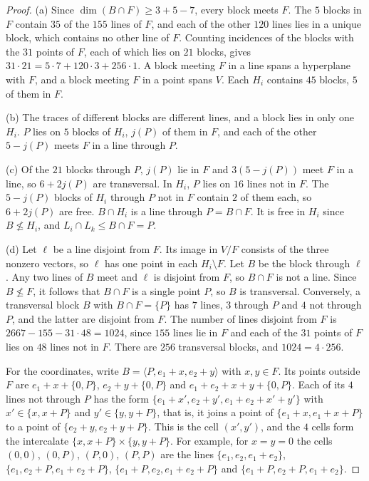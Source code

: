 \documentclass[11pt]{amsart}
\theoremstyle{definition}
\begin{document}
\begin{proof}
(a) Since $\dim(B\cap F)\ge3+5-7$, every block meets $F$. The $5$ blocks in $F$ contain $35$ of the $155$ lines of $F$, and each of the other $120$ lines lies in a unique block, which contains no other line of $F$. Counting incidences of the blocks with the $31$ points of $F$, each of which lies on $21$ blocks, gives $31\cdot21=5\cdot7+120\cdot3+256\cdot1$. A block meeting $F$ in a line spans a hyperplane with $F$, and a block meeting $F$ in a point spans $V$. Each $H_i$ contains $45$ blocks, $5$ of them in $F$.

(b) The traces of different blocks are different lines, and a block lies in only one $H_i$. $P$ lies on $5$ blocks of $H_i$, $j(P)$ of them in $F$, and each of the other $5-j(P)$ meets $F$ in a line through $P$.

(c) Of the $21$ blocks through $P$, $j(P)$ lie in $F$ and $3(5-j(P))$ meet $F$ in a line, so $6+2j(P)$ are transversal. In $H_i$, $P$ lies on $16$ lines not in $F$. The $5-j(P)$ blocks of $H_i$ through $P$ not in $F$ contain $2$ of them each, so $6+2j(P)$ are free. $B\cap H_i$ is a line through $P=B\cap F$. It is free in $H_i$ since $B\not\le H_i$, and $L_i\cap L_k\le B\cap F=P$.

(d) Let $\ell$ be a line disjoint from $F$. Its image in $V/F$ consists of the three nonzero vectors, so $\ell$ has one point in each $H_i\setminus F$. Let $B$ be the block through $\ell$. Any two lines of $B$ meet and $\ell$ is disjoint from $F$, so $B\cap F$ is not a line. Since $B\not\le F$, it follows that $B\cap F$ is a single point $P$, so $B$ is transversal. Conversely, a transversal block $B$ with $B\cap F=\{P\}$ has $7$ lines, $3$ through $P$ and $4$ not through $P$, and the latter are disjoint from $F$. The number of lines disjoint from $F$ is $2667-155-31\cdot48=1024$, since $155$ lines lie in $F$ and each of the $31$ points of $F$ lies on $48$ lines not in $F$. There are $256$ transversal blocks, and $1024=4\cdot256$.

For the coordinates, write $B=\langle P,e_1+x,e_2+y\rangle$ with $x,y\in F$. Its points outside $F$ are $e_1+x+\{0,P\}$, $e_2+y+\{0,P\}$ and $e_1+e_2+x+y+\{0,P\}$. Each of its $4$ lines not through $P$ has the form $\{e_1+x',e_2+y',e_1+e_2+x'+y'\}$ with $x'\in\{x,x+P\}$ and $y'\in\{y,y+P\}$, that is, it joins a point of $\{e_1+x,e_1+x+P\}$ to a point of $\{e_2+y,e_2+y+P\}$. This is the cell $(x',y')$, and the $4$ cells form the intercalate $\{x,x+P\}\times\{y,y+P\}$. For example, for $x=y=0$ the cells $(0,0)$, $(0,P)$, $(P,0)$, $(P,P)$ are the lines $\{e_1,e_2,e_1+e_2\}$, $\{e_1,e_2+P,e_1+e_2+P\}$, $\{e_1+P,e_2,e_1+e_2+P\}$ and $\{e_1+P,e_2+P,e_1+e_2\}$.
\end{proof}
\end{document}
